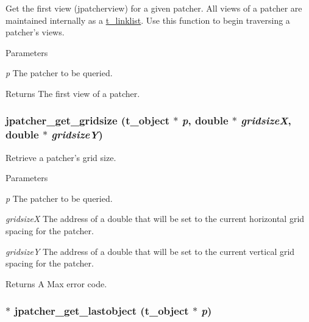 Get the first view (jpatcherview) for a given patcher. All views of a patcher are maintained internally as a \hyperlink{structt__linklist}{t\_\-linklist}. Use this function to begin traversing a patcher's views.


\begin{DoxyParams}{Parameters}
\item[{\em p}]The patcher to be queried. \end{DoxyParams}
\begin{DoxyReturn}{Returns}
The first view of a patcher. 
\end{DoxyReturn}
\hypertarget{group__jpatcher_ga140e8da3e2be163b5cbbb1eef350d70f}{
\subsubsection[{jpatcher\_\-get\_\-gridsize}]{ jpatcher\_\-get\_\-gridsize ({\bf t\_\-object} $\ast$ {\em p}, \/  double $\ast$ {\em gridsizeX}, \/  double $\ast$ {\em gridsizeY})}}
\label{group__jpatcher_ga140e8da3e2be163b5cbbb1eef350d70f}


Retrieve a patcher's grid size. 
\begin{DoxyParams}{Parameters}
\item[{\em p}]The patcher to be queried. \item[{\em gridsizeX}]The address of a double that will be set to the current horizontal grid spacing for the patcher. \item[{\em gridsizeY}]The address of a double that will be set to the current vertical grid spacing for the patcher. \end{DoxyParams}
\begin{DoxyReturn}{Returns}
A Max error code. 
\end{DoxyReturn}
\hypertarget{group__jpatcher_gaffb5e8d5224f7aa04cdbee76a041bab7}{
\subsubsection[{jpatcher\_\-get\_\-lastobject}]{$\ast$ jpatcher\_\-get\_\-lastobject ({\bf t\_\-object} $\ast$ {\em p})}}
\label{group__jpatcher_gaffb5e8d5224f7aa04cdbee76a041bab7}


